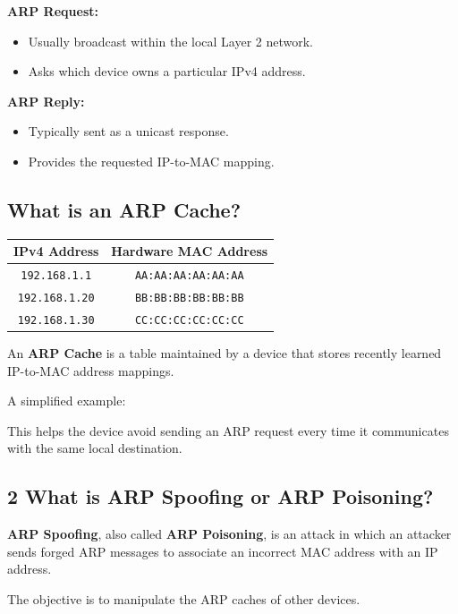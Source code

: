 \textbf{ARP Request:}

\begin{itemize}
\item Usually broadcast within the local Layer 2 network.
\item Asks which device owns a particular IPv4 address.
\end{itemize}

\textbf{ARP Reply:}

\begin{itemize}
\item Typically sent as a unicast response.
\item Provides the requested IP-to-MAC mapping.
\end{itemize}

\subsection{What is an ARP Cache?}
\begin{center}
\begin{tabular}{cc}
\toprule
\textbf{IPv4 Address} & \textbf{Hardware MAC Address} \\
\midrule
\texttt{192.168.1.1} & \texttt{AA:AA:AA:AA:AA:AA} \\
\texttt{192.168.1.20} & \texttt{BB:BB:BB:BB:BB:BB} \\
\texttt{192.168.1.30} & \texttt{CC:CC:CC:CC:CC:CC} \\
\bottomrule
\end{tabular}
\end{center}

An \textbf{ARP Cache} is a table maintained by a device that stores recently learned IP-to-MAC address mappings.

A simplified example:


This helps the device avoid sending an ARP request every time it communicates with the same local destination.

\subsection{2 What is ARP Spoofing or ARP Poisoning?}

\textbf{ARP Spoofing}, also called \textbf{ARP Poisoning}, is an attack in which an attacker sends forged ARP messages to associate an incorrect MAC address with an IP address.

The objective is to manipulate the ARP caches of other devices.

